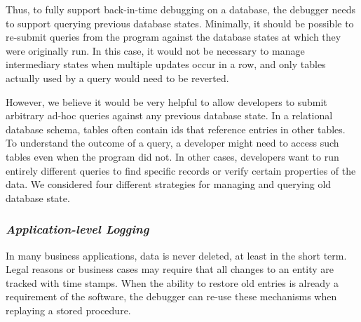 Thus, to fully support back-in-time debugging on a database, the debugger needs to support querying previous database states.
Minimally, it should be possible to re-submit queries from the program against the database states at which they were originally run.
In this case, it would not be necessary to manage intermediary states when multiple updates occur in a row, and only tables actually used by a query would need to be reverted.

However, we believe it would be very helpful to allow developers to submit arbitrary ad-hoc queries against any previous database state.
In a relational database schema, tables often contain ids that reference entries in other tables.
To understand the outcome of a query, a developer might need to access such tables even when the program did not.
In other cases, developers want to run entirely different queries to find specific records or verify certain properties of the data.
We considered four different strategies for managing and querying old database state.

\subsubsection*{\emph{Application-level Logging}}

In many business applications, data is never deleted, at least in the short term.
Legal reasons or business cases may require that all changes to an entity are tracked with time stamps.
When the ability to restore old entries is already a requirement of the software, the debugger can re-use these mechanisms when replaying a stored procedure.

